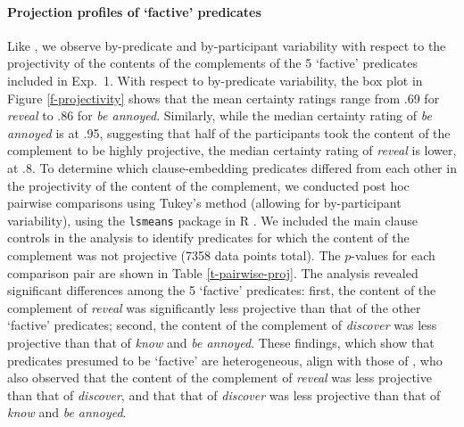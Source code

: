 \documentclass[11pt,fleqn]{article}
\newcommand{\6}{\mbox{$[\hspace*{-.6mm}[$}}
\newcommand{\9}{\mbox{$]\hspace*{-.6mm}]$}}
\begin{document}
\paragraph{Projection profiles of `factive' predicates}  Like \citet{tbd-variability}, we observe by-predicate and by-participant variability with respect to the projectivity of the contents of the complements of  the 5 `factive' predicates included in Exp.~1. With respect to by-predicate variability, the box plot in Figure \ref{f-projectivity} shows that the mean certainty ratings range from .69 for {\em reveal} to .86 for {\em be annoyed}. Similarly, while the median certainty rating of {\em be annoyed} is at .95, suggesting that half of the participants took the content of the complement to be highly projective, the median certainty rating of {\em reveal} is lower, at .8.
To determine which clause-embedding predicates differed from each other in the projectivity of the content of the  complement, we conducted post hoc pairwise comparisons using Tukey's method (allowing for by-participant variability), using the \verb|lsmeans| package \citep{tukey} in R \citep{r}. We included the main clause controls in the analysis to identify predicates for which the content of the complement was not projective (7358 data points total). The $p$-values for each comparison pair are shown in Table \ref{t-pairwise-proj}. The analysis revealed significant differences among the 5 `factive' predicates: first, the content of the complement of {\em reveal} was significantly less projective than that of the other `factive' predicates; second, the content of the complement of {\em discover} was less projective than that of {\em know} and {\em be annoyed}. These findings, which show that predicates presumed to be `factive' are heterogeneous, align with those of \citealt{tbd-variability}, who also observed that the content of the complement of {\em reveal} was less projective than that of {\em discover}, and that that of {\em discover} was less projective than that of {\em know} and {\em be annoyed}. 
\end{document}
